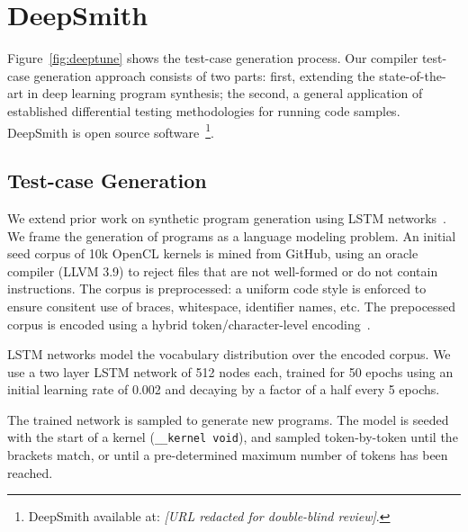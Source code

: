 \section{DeepSmith}

Figure~\ref{fig:deeptune} shows the test-case generation process. Our compiler test-case generation approach consists of two parts: first, extending the state-of-the-art in deep learning program synthesis; the second, a general application of established differential testing methodologies for running code samples. DeepSmith is open source software~\footnote{DeepSmith available at: \emph{[URL redacted for double-blind review]}.}.


\subsection{Test-case Generation}

We extend prior work on synthetic program generation using LSTM networks~\cite{Cummins2017a}. We frame the generation of programs as a language modeling problem. An initial seed corpus of 10k OpenCL kernels is mined from GitHub, using an oracle compiler (LLVM 3.9) to reject files that are not well-formed or do not contain instructions. The corpus is preprocessed: a uniform code style is enforced to ensure consitent use of braces, whitespace, identifier names, etc. The prepocessed corpus is encoded using a hybrid token/character-level encoding~\cite{Cummins2017b}. 

LSTM networks model the vocabulary distribution over the encoded corpus. We use a two layer LSTM network of 512 nodes each, trained for 50 epochs using an initial learning rate of 0.002 and decaying by a factor of a half every 5 epochs.

The trained network is sampled to generate new programs. The model is seeded with the start of a kernel (\texttt{\_\_kernel void}), and sampled token-by-token until the brackets match, or until a pre-determined maximum number of tokens has been reached.


